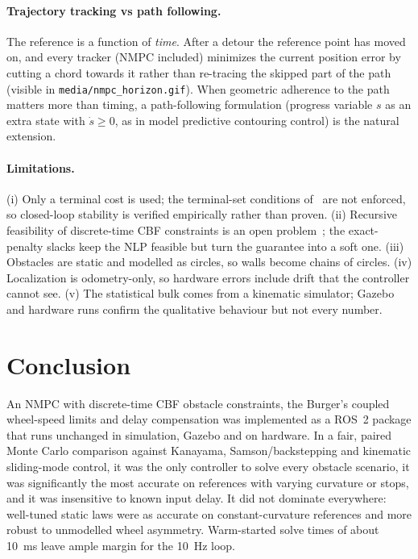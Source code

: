 \documentclass[11pt,a4paper]{article}
\begin{document}
\paragraph{Trajectory tracking vs path following.} The reference is a function of \emph{time}. After a detour the reference point has moved on, and every tracker (NMPC included) minimizes the current position error by cutting a chord towards it rather than re-tracing the skipped part of the path (visible in \texttt{media/nmpc\_horizon.gif}). When geometric adherence to the path matters more than timing, a path-following formulation (progress variable $s$ as an extra state with $\dot s\ge0$, as in model predictive contouring control) is the natural extension.
\paragraph{Limitations.} (i) Only a terminal cost is used; the terminal-set conditions of~\cite{gu2006} are not enforced, so closed-loop stability is verified empirically rather than proven. (ii) Recursive feasibility of discrete-time CBF constraints is an open problem~\cite{zeng2021mpccbf}; the exact-penalty slacks keep the NLP feasible but turn the guarantee into a soft one. (iii) Obstacles are static and modelled as circles, so walls become chains of circles. (iv) Localization is odometry-only, so hardware errors include drift that the controller cannot see. (v) The statistical bulk comes from a kinematic simulator; Gazebo and hardware runs confirm the qualitative behaviour but not every number.

\section{Conclusion}
An NMPC with discrete-time CBF obstacle constraints, the Burger's coupled wheel-speed limits and delay compensation was implemented as a ROS~2 package that runs unchanged in simulation, Gazebo and on hardware. In a fair, paired Monte Carlo comparison against Kanayama, Samson/backstepping and kinematic sliding-mode control, it was the only controller to solve every obstacle scenario, it was significantly the most accurate on references with varying curvature or stops, and it was insensitive to known input delay. It did not dominate everywhere: well-tuned static laws were as accurate on constant-curvature references and more robust to unmodelled wheel asymmetry. Warm-started solve times of about \SI{10}{ms} leave ample margin for the \SI{10}{Hz} loop.



\end{document}

